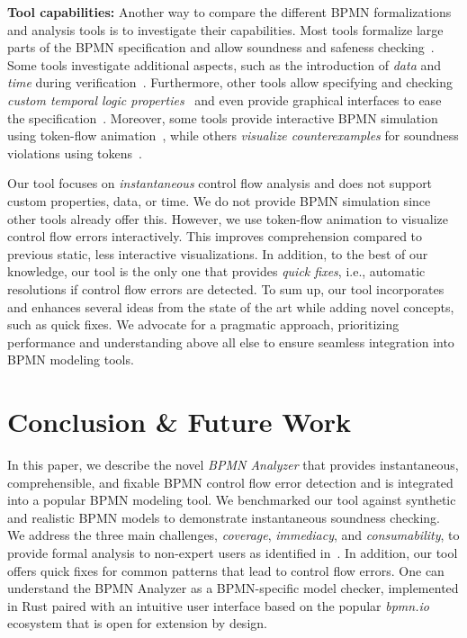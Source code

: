 \documentclass[
onecolumn, %
]{ceurart}
\begin{document}
\textbf{Tool capabilities:}
Another way to compare the different BPMN formalizations and analysis tools is to investigate their capabilities.
Most tools formalize large parts of the BPMN specification and allow soundness and safeness checking~\cite{krauterHigherorderTransformationApproach2024,corradiniFormalApproachAnalysis2021,houhouFirstOrderLogicVerification2022}.
Some tools investigate additional aspects, such as the introduction of \textit{data} and \textit{time} during verification~\cite{houhouFirstOrderLogicVerification2022,corradiniFormalisingAnimatingMultiple2022}.
Furthermore, other tools allow specifying and checking \textit{custom temporal logic properties}~\cite{krauterHigherorderTransformationApproach2024,corradiniFormalApproachAnalysis2021} and even provide graphical interfaces to ease the specification~\cite{krauterHigherorderTransformationApproach2024}.
Moreover, some tools provide interactive BPMN simulation using token-flow animation~\cite{corradiniFormalisingAnimatingMultiple2022}, while others \textit{visualize counterexamples} for soundness violations using tokens~\cite{houhouFirstOrderLogicVerification2022}.

Our tool focuses on \textit{instantaneous} control flow analysis and does not support custom properties, data, or time.
We do not provide BPMN simulation since other tools already offer this.
However, we use token-flow animation to visualize control flow errors interactively.
This improves comprehension compared to previous static, less interactive visualizations.
In addition, to the best of our knowledge, our tool is the only one that provides \textit{quick fixes}, i.e., automatic resolutions if control flow errors are detected.
To sum up, our tool incorporates and enhances several ideas from the state of the art while adding novel concepts, such as quick fixes.
We advocate for a pragmatic approach, prioritizing performance and understanding above all else to ensure seamless integration into BPMN modeling tools.

\section{Conclusion \& Future Work} \label{sec:conclusion}

In this paper, we describe the novel \textit{BPMN Analyzer} that provides instantaneous, comprehensible, and fixable BPMN control flow error detection and is integrated into a popular BPMN modeling tool.
We benchmarked our tool against synthetic and realistic BPMN models to demonstrate instantaneous soundness checking.
We address the three main challenges, \textit{coverage}, \textit{immediacy}, and \textit{consumability}, to provide formal analysis to non-expert users as identified in~\cite{fahlandAnalysisDemandInstantaneous2011}.
In addition, our tool offers quick fixes for common patterns that lead to control flow errors.
One can understand the BPMN Analyzer as a BPMN-specific model checker, implemented in Rust paired with an intuitive user interface based on the popular \textit{bpmn.io} ecosystem that is open for extension by design.
\end{document}
